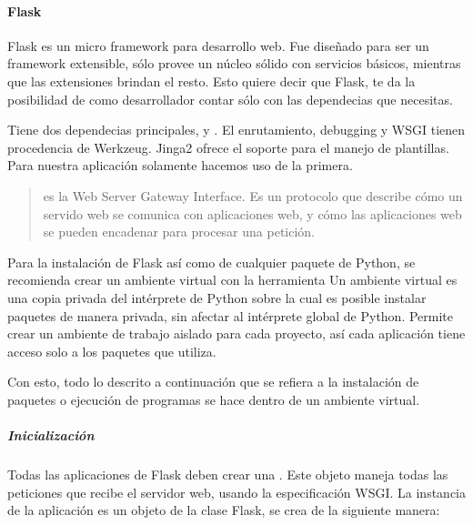 \paragraph{Flask}
\label{\detokenize{chapter_two/desc_cloudnao:flask}}

Flask es un micro framework para desarrollo web. Fue diseñado para ser un
framework extensible, sólo provee un núcleo sólido con servicios básicos,
mientras que las extensiones brindan el resto. Esto quiere decir que Flask,
te da la posibilidad de como desarrollador contar sólo con las dependecias que
necesitas.

Tiene dos dependecias principales,  y .
El enrutamiento, debugging y WSGI tienen procedencia de Werkzeug.
Jinga2 ofrece el soporte para el manejo de plantillas. Para nuestra
aplicación solamente hacemos uso de la primera.
\begin{quote}

 es la Web Server Gateway Interface. Es un protocolo que describe
cómo un servido web se comunica con aplicaciones web, y cómo las aplicaciones
web se pueden encadenar para procesar una petición.
\end{quote}

Para la instalación de Flask así como de cualquier paquete de Python, se
recomienda crear un ambiente virtual con la herramienta 
Un ambiente virtual es una copia privada del intérprete de Python sobre la cual
es posible instalar paquetes de manera privada, sin afectar al intérprete
global de Python. Permite crear un ambiente de trabajo aislado para cada
proyecto, así cada aplicación tiene acceso solo a los paquetes que utiliza.

Con esto, todo lo descrito a continuación que se refiera a la instalación de
paquetes o ejecución de programas se hace dentro de un ambiente virtual.


\subparagraph{Inicialización}
\label{\detokenize{chapter_two/desc_cloudnao:inicializacion}}
Todas las aplicaciones de Flask deben crear una . Este
objeto maneja todas las peticiones que recibe el servidor web, usando
la especificación WSGI.
La instancia de la aplicación es un objeto de la clase Flask,
se crea de la siguiente manera:

\begin{sphinxVerbatim}[commandchars=\\\{\}]
   
  
\end{sphinxVerbatim}

